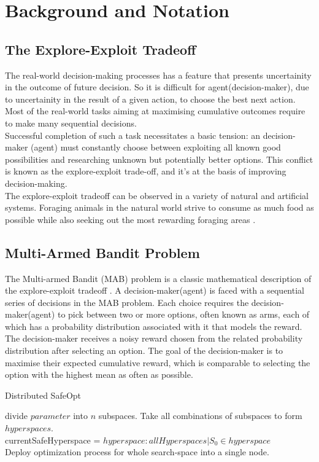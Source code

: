\chapter{Background and Notation}\label{ch:background}
\section{The Explore-Exploit Tradeoff}
The real-world decision-making processes has a feature that presents uncertainity 
in the outcome of future decision. 
So it is difficult for agent(decision-maker), due to uncertainity in the result of a given action, to choose the best next action. 
Most of the real-world tasks aiming at maximising cumulative outcomes require to make many sequential decisions.\\
Successful completion of such a task necessitates a basic tension: an decision-maker (agent) must constantly choose between exploiting all 
known good possibilities and researching unknown but potentially better options. 
This conflict is known as the explore-exploit trade-off, and it's at the basis of improving decision-making.\\
The explore-exploit tradeoff can be observed in a variety of natural and artificial systems. 
Foraging animals in the natural world strive to consume as much food as possible while also seeking out the most rewarding foraging areas \cite{Keasar:2002}.

\section{Multi-Armed Bandit Problem}
The Multi-armed Bandit (MAB) problem is a classic mathematical description 
of the explore-exploit tradeoff \cite{Robbins:1952}. 
A decision-maker(agent) is faced with a sequential series of decisions in the MAB problem. 
Each choice requires the decision-maker(agent) to pick between two or more options, often known as arms, 
each of which has a probability distribution associated with it that models the reward. 
The decision-maker receives a noisy reward chosen from the related probability distribution after selecting an option. 
The goal of the decision-maker is to maximise their expected cumulative reward, 
which is comparable to selecting the option with the highest mean as often as possible.

\begin{algorithm}
	\SetAlgoVlined
	\caption{Distributed SafeOpt}
	{
		divide $parameter$ into $n$ subspaces.
	}
	Take all combinations of subspaces to form $hyperspaces$.\\
	currentSafeHyperspace = $hyperspace : allHyperspaces | S_0 \in hyperspace$\\
	Deploy optimization process for whole search-space into a single node.
\end{algorithm}

